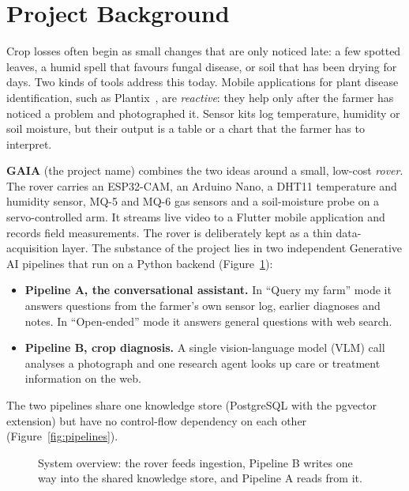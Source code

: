 \section{Project Background}

Crop losses often begin as small changes that are only noticed late: a few spotted leaves, a humid spell that favours
fungal disease, or soil that has been drying for days. Two kinds of tools address this today. Mobile applications for
plant disease identification, such as Plantix~\cite{plantix}, are \emph{reactive}: they help only after the farmer has
noticed a problem and photographed it. Sensor kits log temperature, humidity or soil moisture, but their output is a
table or a chart that the farmer has to interpret.

\textbf{GAIA} (the project name) combines the two ideas around a small, low-cost \emph{rover}. The rover carries an
ESP32-CAM, an Arduino Nano, a DHT11 temperature and humidity sensor, MQ-5 and MQ-6 gas sensors and a soil-moisture
probe on a servo-controlled arm. It streams live video to a Flutter mobile application and records field
measurements. The rover is deliberately kept as a thin data-acquisition layer. The substance of the project lies in
two independent Generative AI pipelines that run on a Python backend (Figure~\ref{fig:overview}):

\begin{itemize}
\item \textbf{Pipeline A, the conversational assistant.} In ``Query my farm'' mode it answers questions from the
      farmer's own sensor log, earlier diagnoses and notes. In ``Open-ended'' mode it answers general questions with
      web search.
\item \textbf{Pipeline B, crop diagnosis.} A single vision-language model (VLM) call analyses a photograph and one
      research agent looks up care or treatment information on the web.
\end{itemize}

The two pipelines share one knowledge store (PostgreSQL with the pgvector extension) but have no control-flow
dependency on each other (Figure~\ref{fig:pipelines}).

\begin{figure}[H]
\centering

\caption{System overview: the rover feeds ingestion, Pipeline B writes one way into the shared knowledge store, and
Pipeline A reads from it.}
\label{fig:overview}
\end{figure}

